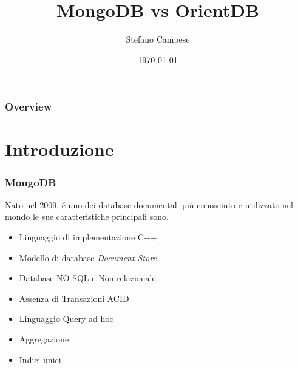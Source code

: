\documentclass{beamer}
\title[MongoDB vs OrientDB]{MongoDB vs OrientDB} %
\author{Stefano Campese} %
\date{\today} %
\begin{document}
\begin{frame}
\titlepage %
\end{frame}

\begin{frame}
\frametitle{Overview} %
\tableofcontents %
\end{frame}


\section{Introduzione} %


\begin{frame}
\frametitle{MongoDB}
Nato nel 2009, \'e uno dei database documentali più conosciuto e utilizzato nel mondo le sue caratteristiche principali sono.
\begin{itemize}
\item Linguaggio di implementazione C++
\item Modello di database \emph{Document Store}
\item Database NO-SQL e Non relazionale
\item Assenza di Transazioni ACID
\item Linguaggio Query ad hoc
\item Aggregazione
\item Indici unici
\end{itemize}
\end{frame}
\end{document}
